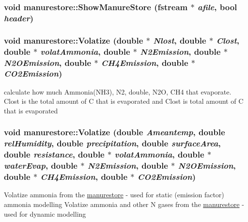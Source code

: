 \hypertarget{classmanurestore_aa710a7d090423b9f29334e18db8788d2}{
\subsubsection[{ShowManureStore}]{\setlength{\rightskip}{0pt plus 5cm}void manurestore::ShowManureStore (fstream $\ast$ {\em afile}, \/  bool {\em header})}}
\label{classmanurestore_aa710a7d090423b9f29334e18db8788d2}
\hypertarget{classmanurestore_aa52a9cf95fe0bf10ce70efaea73a181c}{
\subsubsection[{Volatize}]{\setlength{\rightskip}{0pt plus 5cm}void manurestore::Volatize (double $\ast$ {\em Nlost}, \/  double $\ast$ {\em Clost}, \/  double $\ast$ {\em volatAmmonia}, \/  double $\ast$ {\em N2Emission}, \/  double $\ast$ {\em N2OEmission}, \/  double $\ast$ {\em CH4Emission}, \/  double $\ast$ {\em CO2Emission})}}
\label{classmanurestore_aa52a9cf95fe0bf10ce70efaea73a181c}
calculate how much Ammonia(NH3), N2, double, N2O, CH4 that evaporate. Clost is the total amount of C that is evaporated and Clost is total amount of C that is evaporated \hypertarget{classmanurestore_a20c064bc22937610b638ba0a27c77e62}{
\subsubsection[{Volatize}]{\setlength{\rightskip}{0pt plus 5cm}void manurestore::Volatize (double {\em Ameantemp}, \/  double {\em relHumidity}, \/  double {\em precipitation}, \/  double {\em surfaceArea}, \/  double {\em resistance}, \/  double $\ast$ {\em volatAmmonia}, \/  double $\ast$ {\em waterEvap}, \/  double $\ast$ {\em N2Emission}, \/  double $\ast$ {\em N2OEmission}, \/  double $\ast$ {\em CH4Emission}, \/  double $\ast$ {\em CO2Emission})}}
\label{classmanurestore_a20c064bc22937610b638ba0a27c77e62}
Volatize ammonia from the \hyperlink{classmanurestore}{manurestore} -\/ used for static (emission factor) ammonia modelling Volatize ammonia and other N gases from the \hyperlink{classmanurestore}{manurestore} -\/ used for dynamic modelling 

